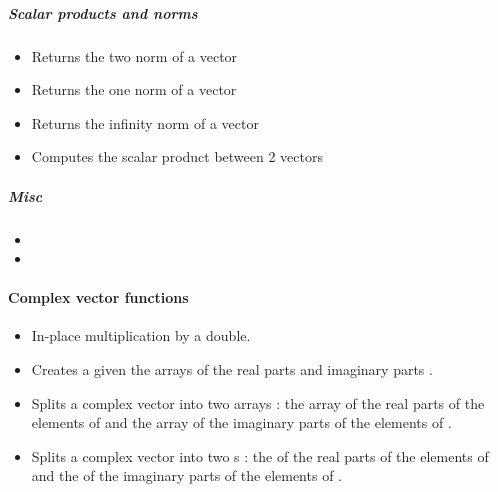 \subparagraph{Scalar products and norms}
\begin{itemize}
\item {}
  \sshortdescribe Returns the two norm of a vector  

\item {}
  \sshortdescribe Returns the one norm of a vector  

\item {}
  \sshortdescribe Returns the infinity norm of a vector  

\item {} 
  \sshortdescribe Computes the scalar product between 2 vectors  
\end{itemize}

\subparagraph{Misc}

\begin{itemize}
\item {}
\item {}
\end{itemize}


\paragraph{Complex vector functions}

\begin{itemize}
\item {}
  \sshortdescribe In-place multiplication by a double.

\item {}
  \sshortdescribe Creates a  given the arrays of the
  real parts  and imaginary parts .
\item {}
  \sshortdescribe Splits a complex vector into two arrays : the array of the
  real parts of the elements of  and the array of the imaginary parts
  of the elements of .
\item {}
  \sshortdescribe Splits a complex vector into two s : the
   of the real parts of the elements of  and the
   of the imaginary parts of the elements of .
\end{itemize}

